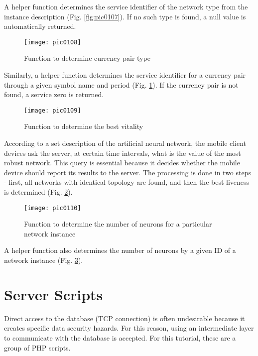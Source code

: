 A helper function determines the service identifier of the network type from the instance description (Fig. \ref{fig:pic0107}). If no such type is found, a null value is automatically returned.

\begin{figure}[h]
\centering
\texttt{[image: pic0108]}
\caption{Function to determine currency pair type}
\label{fig:pic0108}
\end{figure}
\FloatBarrier

Similarly, a helper function determines the service identifier for a currency pair through a given symbol name and period (Fig. \ref{fig:pic0108}). If the currency pair is not found, a service zero is returned.

\begin{figure}[h]
\centering
\texttt{[image: pic0109]}
\caption{Function to determine the best vitality}
\label{fig:pic0109}
\end{figure}
\FloatBarrier

According to a set description of the artificial neural network, the mobile client devices ask the server, at certain time intervals, what is the value of the most robust network. This query is essential because it decides whether the mobile device should report its results to the server. The processing is done in two steps - first, all networks with identical topology are found, and then the best liveness is determined (Fig. \ref{fig:pic0109}).

\begin{figure}[h]
\centering
\texttt{[image: pic0110]}
\caption{Function to determine the number of neurons for a particular network instance}
\label{fig:pic0110}
\end{figure}
\FloatBarrier

A helper function also determines the number of neurons by a given ID of a network instance (Fig. \ref{fig:pic0110}).

\section{Server Scripts}

Direct access to the database (TCP connection) is often undesirable because it creates specific data security hazards. For this reason, using an intermediate layer to communicate with the database is accepted. For this tutorial, these are a group of PHP scripts.

